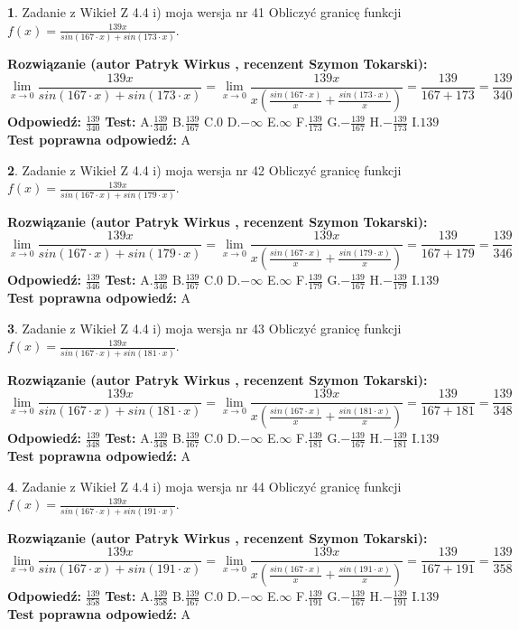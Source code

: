 \documentclass[12pt, a4paper]{article}
\theoremstyle{definition} %
\newtheorem{zad}{}
\newcommand{\zadStart}[1]{\begin{zad}#1\newline}
\newcommand{\zadStop}{\end{zad}}
\newcommand{\rozwStart}[2]{\noindent \textbf{Rozwiązanie (autor #1 , recenzent #2): }\newline}
\newcommand{\rozwStop}{\newline}
\newcommand{\odpStart}{\noindent \textbf{Odpowiedź:}\newline}
\newcommand{\odpStop}{\newline}
\newcommand{\testStart}{\noindent \textbf{Test:}\newline}
\newcommand{\testStop}{\newline}
\newcommand{\kluczStart}{\noindent \textbf{Test poprawna odpowiedź:}\newline}
\newcommand{\kluczStop}{\newline}
\begin{document}
\zadStart{Zadanie z Wikieł Z 4.4 i) moja wersja nr 41}
Obliczyć granicę funkcji $f(x)=\frac{139x}{sin(167\cdot x) +sin(173\cdot x)}$.
\zadStop
\rozwStart{Patryk Wirkus}{Szymon Tokarski}
$$\lim\limits_{x\to 0}\frac{139x}{sin(167\cdot x) +sin(173\cdot x)}=\lim\limits_{x\to 0}\frac{139x}{x(\frac{sin(167\cdot x)}{x}+\frac{sin(173\cdot x)}{x})}=\frac{139}{167+173} = \frac{139}{340}$$
\rozwStop
\odpStart
$\frac{139}{340}$
\odpStop
\testStart
A.$\frac{139}{340}$
B.$\frac{139}{167}$
C.$0$
D.$-\infty$
E.$\infty$
F.$\frac{139}{173}$
G.$-\frac{139}{167}$
H.$-\frac{139}{173}$
I.$139$
\testStop
\kluczStart
A
\kluczStop



\zadStart{Zadanie z Wikieł Z 4.4 i) moja wersja nr 42}
Obliczyć granicę funkcji $f(x)=\frac{139x}{sin(167\cdot x) +sin(179\cdot x)}$.
\zadStop
\rozwStart{Patryk Wirkus}{Szymon Tokarski}
$$\lim\limits_{x\to 0}\frac{139x}{sin(167\cdot x) +sin(179\cdot x)}=\lim\limits_{x\to 0}\frac{139x}{x(\frac{sin(167\cdot x)}{x}+\frac{sin(179\cdot x)}{x})}=\frac{139}{167+179} = \frac{139}{346}$$
\rozwStop
\odpStart
$\frac{139}{346}$
\odpStop
\testStart
A.$\frac{139}{346}$
B.$\frac{139}{167}$
C.$0$
D.$-\infty$
E.$\infty$
F.$\frac{139}{179}$
G.$-\frac{139}{167}$
H.$-\frac{139}{179}$
I.$139$
\testStop
\kluczStart
A
\kluczStop



\zadStart{Zadanie z Wikieł Z 4.4 i) moja wersja nr 43}
Obliczyć granicę funkcji $f(x)=\frac{139x}{sin(167\cdot x) +sin(181\cdot x)}$.
\zadStop
\rozwStart{Patryk Wirkus}{Szymon Tokarski}
$$\lim\limits_{x\to 0}\frac{139x}{sin(167\cdot x) +sin(181\cdot x)}=\lim\limits_{x\to 0}\frac{139x}{x(\frac{sin(167\cdot x)}{x}+\frac{sin(181\cdot x)}{x})}=\frac{139}{167+181} = \frac{139}{348}$$
\rozwStop
\odpStart
$\frac{139}{348}$
\odpStop
\testStart
A.$\frac{139}{348}$
B.$\frac{139}{167}$
C.$0$
D.$-\infty$
E.$\infty$
F.$\frac{139}{181}$
G.$-\frac{139}{167}$
H.$-\frac{139}{181}$
I.$139$
\testStop
\kluczStart
A
\kluczStop



\zadStart{Zadanie z Wikieł Z 4.4 i) moja wersja nr 44}
Obliczyć granicę funkcji $f(x)=\frac{139x}{sin(167\cdot x) +sin(191\cdot x)}$.
\zadStop
\rozwStart{Patryk Wirkus}{Szymon Tokarski}
$$\lim\limits_{x\to 0}\frac{139x}{sin(167\cdot x) +sin(191\cdot x)}=\lim\limits_{x\to 0}\frac{139x}{x(\frac{sin(167\cdot x)}{x}+\frac{sin(191\cdot x)}{x})}=\frac{139}{167+191} = \frac{139}{358}$$
\rozwStop
\odpStart
$\frac{139}{358}$
\odpStop
\testStart
A.$\frac{139}{358}$
B.$\frac{139}{167}$
C.$0$
D.$-\infty$
E.$\infty$
F.$\frac{139}{191}$
G.$-\frac{139}{167}$
H.$-\frac{139}{191}$
I.$139$
\testStop
\kluczStart
A
\kluczStop
\end{document}

